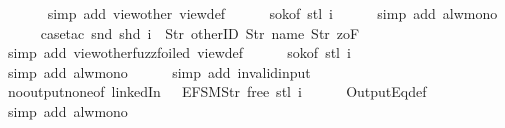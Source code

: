 \begin{isabellebody}
\ \ \ \ \ \isamarkupfalse%
\ {\isacharparenleft}simp\ add{\isacharcolon}\ view{\isacharunderscore}other\ view{}{\isacharunderscore}def{\isacharparenright}\isanewline
\ \ \ \ \isamarkupfalse%
\ s{}{\isacharunderscore}ok{\isacharbrackleft}of\ {\isachardoublequoteopen}stl\ i{\isachardoublequoteclose}{\isacharbrackright}\isanewline
\ \ \ \ \isamarkupfalse%
\ {\isacharparenleft}simp\ add{\isacharcolon}\ alw{\isacharunderscore}mono{\isacharparenright}\isanewline
\ \ \ \ \isamarkupfalse%
\ {\isacharparenleft}case{\isacharunderscore}tac\ {\isachardoublequoteopen}{\isacharparenleft}snd\ {\isacharparenleft}shd\ i{\isacharparenright}{\isacharparenright}\ {\isacharequal}\ {\isacharbrackleft}Str\ {\isacharprime}{\isacharprime}otherID{\isacharprime}{\isacharprime}{\isacharcomma}\ Str\ {\isacharprime}{\isacharprime}name{\isacharprime}{\isacharprime}{\isacharcomma}\ Str\ {\isacharprime}{\isacharprime}{}zoF{\isacharprime}{\isacharprime}{\isacharbrackright}{\isachardoublequoteclose}{\isacharparenright}\isanewline
\ \ \ \ \ \isamarkupfalse%
\ {\isacharparenleft}simp\ add{\isacharcolon}\ view{\isacharunderscore}other{\isacharunderscore}fuzz{\isacharunderscore}foiled\ view{}{\isacharunderscore}def{\isacharparenright}\isanewline
\ \ \ \ \isamarkupfalse%
\ s{}{\isacharunderscore}ok{\isacharbrackleft}of\ {\isachardoublequoteopen}stl\ i{\isachardoublequoteclose}{\isacharbrackright}\isanewline
\ \ \ \ \isamarkupfalse%
\ {\isacharparenleft}simp\ add{\isacharcolon}\ alw{\isacharunderscore}mono{\isacharparenright}\isanewline
\ \ \ \ \isamarkupfalse%
\ {\isacharparenleft}simp\ add{\isacharcolon}\ invalid{\isacharunderscore}input{\isacharunderscore}{}{\isacharparenright}\isanewline
\ \ \ \ \isamarkupfalse%
\ no{\isacharunderscore}output{\isacharunderscore}none{\isacharbrackleft}of\ linkedIn\ {\isachardoublequoteopen}{\isacharparenleft}{\isacharless}{\isachargreater}{\isacharparenleft}{}\ {\isacharcolon}{\isacharequal}\ EFSM{\isachardot}Str\ {\isacharprime}{\isacharprime}free{\isacharprime}{\isacharprime}{\isacharparenright}{\isacharparenright}{\isachardoublequoteclose}\ {\isachardoublequoteopen}{\isacharparenleft}stl\ i{\isacharparenright}{\isachardoublequoteclose}{\isacharbrackright}\isanewline
\ \ \ \ \isamarkupfalse%
\ OutputEq{\isacharunderscore}def\isanewline
\ \ \ \ \isamarkupfalse%
\ {\isacharparenleft}simp\ add{\isacharcolon}\ alw{\isacharunderscore}mono{\isacharparenright}\isanewline

\end{isabellebody}
